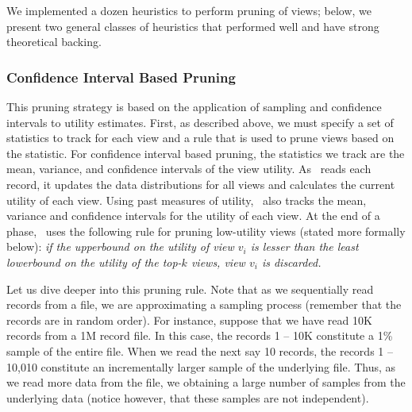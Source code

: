 We implemented a dozen heuristics to perform pruning of views; below, we present
two general classes of heuristics that performed well and have strong
theoretical backing.

\subsubsection{Confidence Interval Based Pruning}
\label{sec:confident_interval}
This pruning strategy is based on the application of sampling and confidence
intervals to utility estimates. First, as described above, we must specify
a set of statistics to track for each view and a rule that is used to
prune views based on the statistic.
For confidence interval based pruning, the statistics we track are the mean, 
variance, and confidence intervals of the view utility.
As \VizRecDB\ reads each record, it updates the data
distributions for all views and calculates the current utility of each view. 
Using past measures of utility, \VizRecDB\ also tracks the mean,
variance and confidence intervals for the utility of each view.
At the end of a phase, \VizRecDB\ uses the following rule for pruning low-utility
views (stated more formally below): {\it if the upperbound on the utility
of view $v_i$ is lesser than the least lowerbound on the utility of the
top-$k$ views, view $v_i$ is discarded.}

Let us dive deeper into this pruning rule.
Note that as we sequentially read records from a file, we are
approximating a sampling process (remember that the records are in random order).
For instance, suppose that we have read 10K records from a 1M record file.
In this case, the records 1 -- 10K constitute a 1\% sample of the entire file.
When we read the next say 10 records, the records 1 -- 10,010 constitute an
incrementally larger sample of the underlying file.
Thus, as we read more data from the file, we obtaining a large
number of samples from the underlying data (notice however, that these samples
are not independent).

